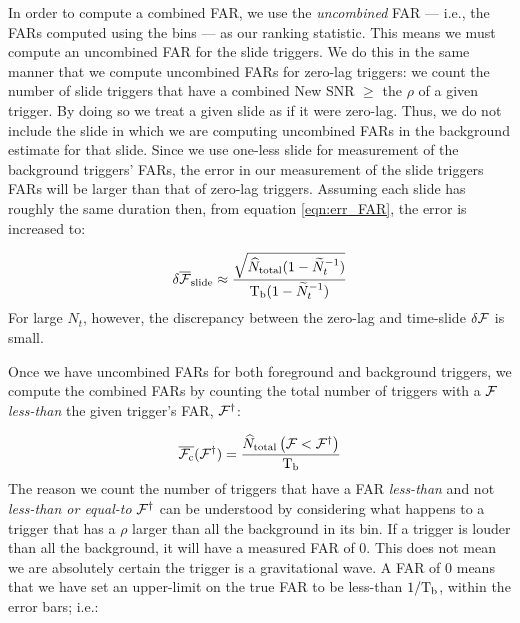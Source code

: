In order to compute a combined \ac{FAR}, we use the \emph{uncombined} \ac{FAR} --- i.e., the \acp{FAR} computed using the bins --- as our ranking statistic. This means we must compute an uncombined \ac{FAR} for the slide triggers. We do this in the same manner that we compute uncombined \acp{FAR} for zero-lag triggers: we count the number of slide triggers that have a combined New \ac{SNR} $\geq$ the $\rho$ of a given trigger. By doing so we treat a given slide as if it were zero-lag. Thus, we do not include the slide in which we are computing uncombined \acp{FAR} in the background estimate for that slide. Since we use one-less slide for measurement of the background triggers' \acp{FAR}, the error in our measurement of the slide triggers \acp{FAR} will be larger than that of zero-lag triggers. Assuming each slide has roughly the same duration then, from equation \ref{eqn:err_FAR}, the error is increased to:

\begin{equation}
\label{eqn:err_FAR_slide}
\delta \overline{\far}_{\mathrm{slide}} \approx \frac{\sqrt{ \widehat{N}_{\mathrm{total}} ( 1 - \widetilde{N}_t^{-1} ) }}{ \Tb (1- \widetilde{N}_t^{-1}) }
\end{equation}
For large $N_t$, however, the discrepancy between the zero-lag and time-slide $\delta \mathcal{F}$ is small. 

Once we have uncombined \acp{FAR} for both foreground and background triggers, we compute the combined \acp{FAR} by counting the total number of triggers with a $\mathcal{F}$ \emph{less-than} the given trigger's \ac{FAR}, $\mathcal{F}^\dagger$:

\begin{equation}
\label{eqn:cfar_1}
\overline{\cfar}( \far^\dagger ) = \frac{ \widehat{N}_{\mathrm{total}}\left( \far < \far^\dagger \right) }{\Tb}
\end{equation}
The reason we count the number of triggers that have a \ac{FAR} \emph{less-than} and not \emph{less-than or equal-to} $\mathcal{F}^\dagger$ can be understood by considering what happens to a trigger that has a $\rho$ larger than all the background in its bin. If a trigger is louder than all the background, it will have a measured \ac{FAR} of 0. This does not mean we are absolutely certain the trigger is a gravitational wave. A \ac{FAR} of 0 means that we have set an upper-limit on the true \ac{FAR} to be less-than $1/\mathrm{T_b}$, within the error bars; i.e.:

